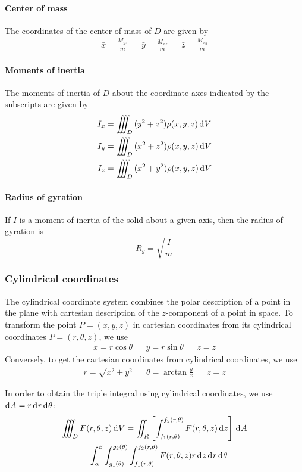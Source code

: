 \documentclass[10pt, twocolumn]{article}
\theoremstyle{remark}
\begin{document}
\paragraph*{Center of mass}
The coordinates of the center of mass of \(D\) are given by
\begin{align*}
  \bar{x} = \frac{M_{yz}}{m} &  & \bar{y} = \frac{M_{xz}}{m} &  & \bar{z} = \frac{M_{xy}}{m}
\end{align*}

\paragraph*{Moments of inertia}
The moments of inertia of \(D\) about the coordinate axes indicated by the subscripts are given by
\begin{align*}
  I_x & = \iiint_D {(y^2 + z^2 )\rho(x, y, z) \,\mathrm{d}^{} V} \\
  I_y & = \iiint_D {(x^2 + z^2 )\rho(x, y, z) \,\mathrm{d}^{} V} \\
  I_z & = \iiint_D {(x^2 + y^2 )\rho(x, y, z) \,\mathrm{d}^{} V}
\end{align*}

\paragraph*{Radius of gyration}
If \(I\) is a moment of inertia of the solid about a given axis, then the radius of gyration is
\[
  R_g = \sqrt{\frac{I}{m}}
\]

\subsubsection*{Cylindrical coordinates}
The cylindrical coordinate system combines the polar description of a point in the plane with cartesian description of the \(z\)-component of a point in space.
To transform the point \(P = (x, y, z)\) in cartesian coordinates from its cylindrical coordinates \(P = (r, \theta, z)\), we use
\begin{align*}
  x = r\cos\theta &  & y = r\sin\theta &  & z = z
\end{align*}
Conversely, to get the cartesian coordinates from cylindrical coordinates, we use
\begin{align*}
  r = \sqrt{x^2 + y^2 } &  & \theta = \arctan{\frac{y}{x}} &  & z = z
\end{align*}

In order to obtain the triple integral using cylindrical coordinates, we use \(\mathrm{d}^{} A = r\,\mathrm{d}^{} r\,\mathrm{d}^{} \theta\):
\begin{multline*}
  \iiint_D {F(r, \theta, z) \,\mathrm{d}^{} V} = \iint_R \left[ \int_{f_1 (r, \theta)}^{f_2 (r, \theta)}{F(r, \theta, z) \,\mathrm{d}^{} z} \right] \,\mathrm{d}^{} A \\
  = \int_{\alpha}^{\beta}{\int_{g_1 (\theta)}^{g_2 (\theta)}{\int_{f_1 (r, \theta)}^{f_2 (r, \theta)}{F(r, \theta, z) r \,\mathrm{d}^{} z}\,\mathrm{d}^{} r}\,\mathrm{d}^{} \theta}
\end{multline*}
\end{document}
